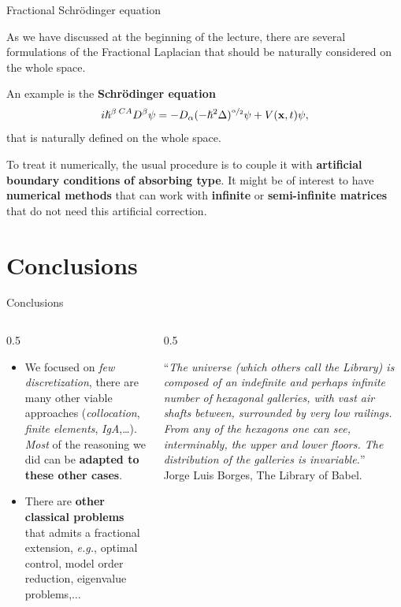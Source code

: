 \documentclass[aspectratio=169,xcolor=dvipsnames]{beamer}
\begin{document}
	\begin{frame}{Fractional Schr\"{o}dinger equation}
	
	As we have discussed at the beginning of the lecture, there are several formulations of the Fractional Laplacian that should be naturally \alert{considered on the whole space}.\vfill
	
	An example is the \textbf{Schr\"{o}dinger equation}
	\[
	i \hslash^\beta \prescript{CA}{}{D}^\beta \psi =  - D_\alpha (- \hslash^2 \Delta )^{\nicefrac{\alpha}{2}} \psi + V(\mathbf{x},t)\psi,
	\]
	that is naturally defined on the whole space. \vfill
	
	To treat it numerically, the usual procedure is to couple it with \alert{\textbf{artificial boundary conditions of absorbing type}}. It might be of interest to have \textbf{numerical methods} that can work with \textbf{infinite} or \textbf{semi-infinite matrices} that do not need this artificial correction.
	
	\end{frame}

	\section{Conclusions}

	\begin{frame}{Conclusions}
	
	\begin{columns}
	\begin{column}{0.5\columnwidth}
	\begin{itemize}
		\item[\faCog] We focused on \emph{few discretization}, there are many other viable approaches (\emph{collocation}, \emph{finite elements}, \emph{IgA},\ldots). \emph{Most} of the reasoning we did can be \alert{\textbf{adapted to these other cases}}.
		
		\item[\faHammer] There are \textbf{other classical problems} that admits a fractional extension, \emph{e.g.}, optimal control, model order reduction, eigenvalue problems,$\ldots$ 
	\end{itemize}
	\end{column}
	\begin{column}{0.5\columnwidth}
	\begin{flushright}
	``\textit{The universe (which others call the Library) is composed of an indefinite and
	perhaps infinite number of hexagonal galleries, with vast air shafts between,
	surrounded by very low railings. From any of the hexagons one can see,
	interminably, the upper and lower floors. The distribution of the galleries is
	invariable.}''\\[2em]
	
	Jorge Luis Borges, The Library of Babel.
	\end{flushright}
	\end{column}
	\end{columns}
	
	\end{frame}
\end{document}
